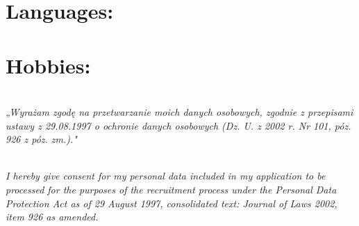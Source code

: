 \documentclass[10pt,a4paper,sans]{moderncv}
\begin{document}
\section{Languages:}
\section{Hobbies:}
\hfill

\textit{\\„Wyrażam zgodę na przetwarzanie moich danych osobowych, zgodnie z przepisami ustawy z 29.08.1997 o ochronie danych osobowych (Dz. U. z 2002 r. Nr 101, póz. 926 z póz. zm.)."}

\textit{\\I hereby give consent for my personal data included in my application to be processed for the purposes of the recruitment process under the Personal Data Protection Act as of 29 August 1997, consolidated text: Journal of Laws 2002, item 926 as amended.}
\end{document}
